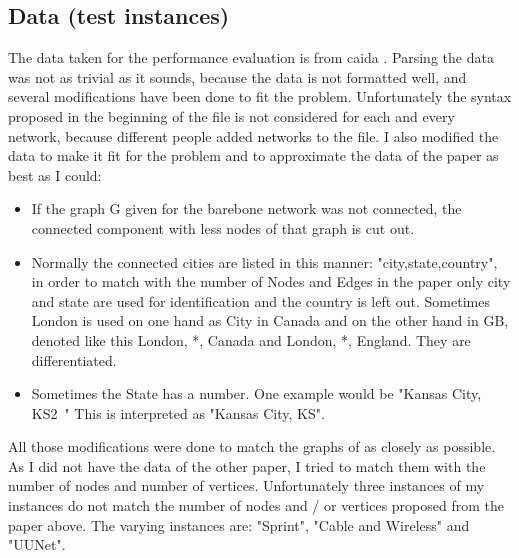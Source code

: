 \documentclass [12pt]{article}
\begin{document}
  \subsection{Data (test instances)}
  The data taken for the performance evaluation is from caida \cite{caidabarebones}. Parsing the
  data was not as trivial as it sounds, because the data is not formatted well,
  and several modifications have been done to fit the problem.
  Unfortunately the syntax proposed in the beginning of the file is not considered
  for each and every network, because different people added networks to the file.
  I also modified the data to make it fit for the problem and to approximate the
  data of the paper \cite{mirrorserver} as best as I could:
  \begin{itemize}
    \item If the graph G given for the barebone network was not connected,
      the connected component with less nodes of that graph is cut out.
    \item Normally the connected cities are listed in this manner:
      "city,state,country", in order to match with the number of Nodes and Edges
      in the paper \cite{mirrorserver} only city and state are used for
      identification and the country is left out. Sometimes London
      is used on one hand as City in Canada and on the other hand in GB, denoted like this
      London, *, Canada and London, *, England. They are differentiated.
    \item Sometimes the State has a number. One example would be "Kansas City, KS2~"
      This is interpreted as "Kansas City, KS".
  \end{itemize}

  All those modifications were done to match the graphs of \cite{mirrorserver} as closely as possible.
  As I did not have the data of the other paper, I tried to match them with the number of
  nodes and number of vertices. Unfortunately three instances of my instances do not
  match the number of nodes and / or vertices proposed from the paper above.
  The varying instances are: "Sprint", "Cable and Wireless" and "UUNet".
\end{document}
